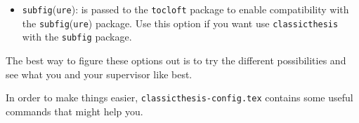 \begin{itemize}
\begin{itemize}
        \item\texttt{subfig}(\texttt{ure}): is passed to the \texttt{tocloft} 
        package to enable compatibility with the \texttt{subfig}(\texttt{ure}) 
        package. Use this option if you want use \texttt{classicthesis} with the
        \texttt{subfig} package.
        
    \end{itemize}    
    
    
\end{itemize}
The best way to figure these options out is to try the different
possibilities and see what you and your supervisor like best.

In order to make things easier, \texttt{classicthesis-config.tex} 
contains some useful commands that might help you.
